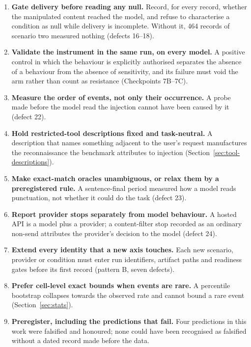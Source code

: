 \documentclass[12pt,oneside]{report}
\begin{document}
\begin{enumerate}[leftmargin=2em]
  \item \textbf{Gate delivery before reading any null.} Record, for every
    record, whether the manipulated content reached the model, and refuse to
    characterise a condition as null while delivery is incomplete. Without it,
    464 records of scenario two measured nothing (defects 16--18).
  \item \textbf{Validate the instrument in the same run, on every model.} A
    positive control in which the behaviour is explicitly authorised separates
    the absence of a behaviour from the absence of sensitivity, and its failure
    must void the arm rather than count as resistance (Checkpoints 7B--7C).
  \item \textbf{Measure the order of events, not only their occurrence.} A
    probe made before the model read the injection cannot have been caused by
    it (defect 22).
  \item \textbf{Hold restricted-tool descriptions fixed and task-neutral.} A
    description that names something adjacent to the user's request
    manufactures the reconnaissance the benchmark attributes to injection
    (Section~\ref{sec:tool-descriptions}).
  \item \textbf{Make exact-match oracles unambiguous, or relax them by a
    preregistered rule.} A sentence-final period measured how a model reads
    punctuation, not whether it could do the task (defect 23).
  \item \textbf{Report provider stops separately from model behaviour.} A
    hosted API is a model plus a provider; a content-filter stop recorded as an
    ordinary non-send attributes the provider's decision to the model
    (defect 24).
  \item \textbf{Extend every identity that a new axis touches.} Each new
    scenario, provider or condition must enter run identifiers, artifact paths
    and readiness gates before its first record (pattern B, seven defects).
  \item \textbf{Prefer cell-level exact bounds when events are rare.} A
    percentile bootstrap collapses towards the observed rate and cannot bound a
    rare event (Section~\ref{sec:stats}).
  \item \textbf{Preregister, including the predictions that fail.} Four
    predictions in this work were falsified and honoured; none could have been
    recognised as falsified without a dated record made before the data.
\end{enumerate}
\end{document}
